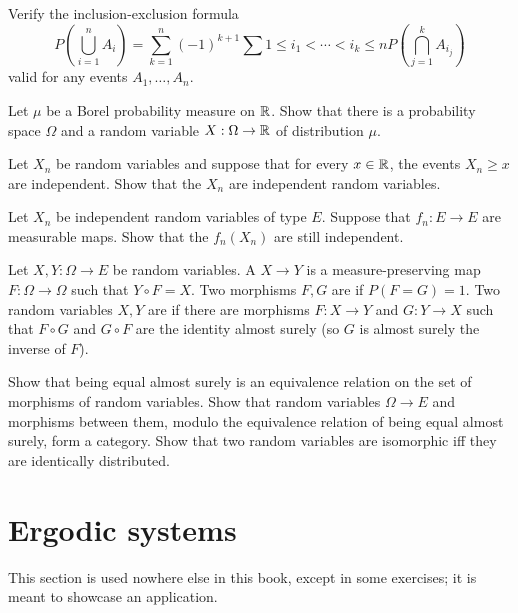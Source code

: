 \begin{exercise}
Verify the inclusion-exclusion formula
\[P\left(\bigcup_{i=1}^{n} A_i\right) = \sum_{k=1}^{n} (-1)^{k+1} \sum{1 \leq i_1 < \cdots < i_{k} \leq n} P\left(\bigcap_{j=1}^{k} A_{i_{j}}\right)\]
valid for any events $A_1, \dots, A_{n}$.
\end{exercise}

\begin{exercise}
\label{Skohorod representation}
Let $\mu$ be a Borel probability measure on $\mathbb{R}$.
Show that there is a probability space $\Omega$ and a random variable $X: \Omega \to \mathbb{R}$ of distribution $\mu$.
\end{exercise}

\begin{exercise}
Let $X_{n}$ be random variables and suppose that for every $x \in \mathbb{R}$, the events $X_{n} \geq x$ are independent.
Show that the $X_{n}$ are independent random variables.
\end{exercise}

\begin{exercise}
Let $X_{n}$ be independent random variables of type $E$.
Suppose that $f_{n}: E \to E$ are measurable maps.
Show that the $f_{n}(X_{n})$ are still independent.
\end{exercise}

\begin{exercise}
Let $X, Y: \Omega \to E$ be random variables.
A  $X \to Y$ is a measure-preserving map $F: \Omega \to \Omega$ such that $Y \circ F = X$.
Two morphisms $F,G$ are  if $P(F = G) = 1$.
Two random variables $X,Y$ are  if there are morphisms $F: X \to Y$ and $G: Y \to X$ such that $F \circ G$ and $G \circ F$ are the identity almost surely (so $G$ is almost surely the inverse of $F$).

Show that being equal almost surely is an equivalence relation on the set of morphisms of random variables.
Show that random variables $\Omega \to E$ and morphisms between them, modulo the equivalence relation of being equal almost surely, form a category.
Show that two random variables are isomorphic iff they are identically distributed.
\end{exercise}

\section{Ergodic systems}
This section is used nowhere else in this book, except in some exercises; it is meant to showcase an application.


